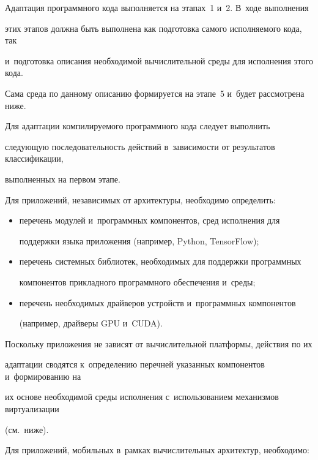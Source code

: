       

      Адаптация программного кода выполняется на этапах~1 и~2. В~ходе выполнения 

этих этапов должна быть выполнена как подготовка самого исполняемого кода, так 

и~подготовка описания необходимой вычислительной среды для исполнения этого кода. 

Сама среда по данному описанию формируется на этапе~5 и~будет рассмотрена ниже.

      

      Для адаптации компилируемого программного кода следует выполнить 

следующую последовательность действий в~зависимости от результатов классификации, 

выполненных на первом этапе.

      

      Для приложений, независимых от архитектуры, необходимо определить:

      \begin{itemize}

      \item перечень модулей и~программных компонентов, сред исполнения для 

поддержки языка приложения (например, Python, TensorFlow);

      \item перечень системных библиотек, необходимых для поддержки программных 

компонентов прикладного программного обеспечения и~среды;

      \item перечень необходимых драйверов устройств и~программных компонентов 

(например, драйверы GPU и~CUDA).

      \end{itemize}

      

      Поскольку приложения не зависят от вычислительной платформы, действия по их 

адаптации сводятся к~определению перечней указанных компонентов и~формированию на 

их основе необходимой среды исполнения с~использованием механизмов виртуализации 

(см.\ ниже). 

      

      Для приложений, мобильных в~рамках вычислительных архитектур, необходимо:


